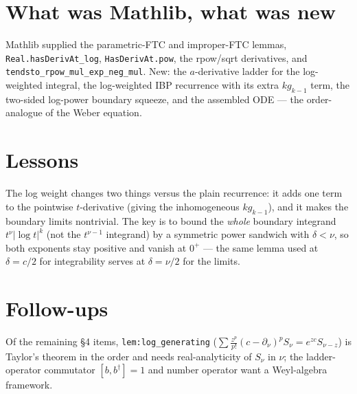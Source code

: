 \documentclass[11pt]{article}
\begin{document}
\section{What was Mathlib, what was new}
Mathlib supplied the parametric-FTC and improper-FTC lemmas, \texttt{Real.hasDerivAt\_log},
\texttt{HasDerivAt.pow}, the rpow/sqrt derivatives, and \texttt{tendsto\_rpow\_mul\_exp\_neg\_mul}. New:
the $a$-derivative ladder for the log-weighted integral, the log-weighted IBP recurrence with its extra
$k g_{k-1}$ term, the two-sided log-power boundary squeeze, and the assembled ODE --- the order-analogue
of the Weber equation.

\section{Lessons}
The log weight changes two things versus the plain recurrence: it adds one term to the pointwise
$t$-derivative (giving the inhomogeneous $k g_{k-1}$), and it makes the boundary limits nontrivial. The
key is to bound the \emph{whole} boundary integrand $t^\nu|\log t|^k$ (not the $t^{\nu-1}$ integrand) by
a symmetric power sandwich with $\delta<\nu$, so both exponents stay positive and vanish at $0^+$ ---
the same lemma used at $\delta=c/2$ for integrability serves at $\delta=\nu/2$ for the limits.

\section{Follow-ups}
Of the remaining \S4 items, \texttt{lem:log\_generating} ($\sum\frac{z^p}{p!}(c-\partial_\nu)^p S_\nu=
e^{zc}S_{\nu-z}$) is Taylor's theorem in the order and needs real-analyticity of $S_\nu$ in $\nu$; the
ladder-operator commutator $[b,b^\dagger]=1$ and number operator want a Weyl-algebra framework.
\end{document}
